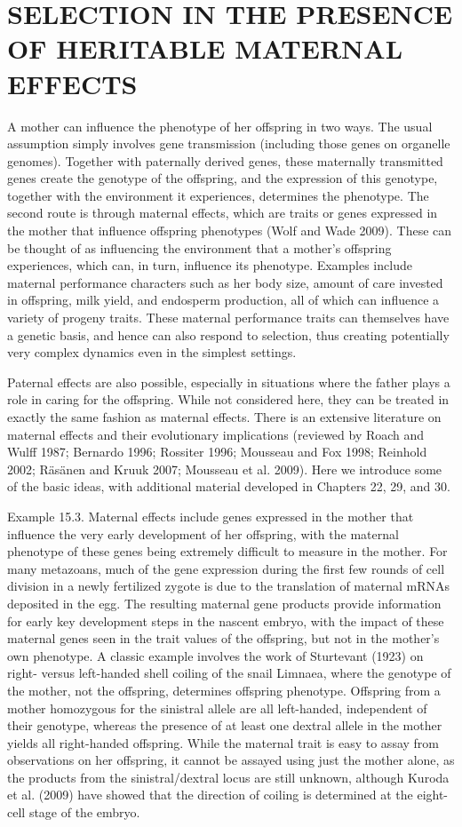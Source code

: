 \documentclass{article}
\begin{document}
\section{SELECTION IN THE PRESENCE OF HERITABLE MATERNAL EFFECTS}
A mother can influence the phenotype of her offspring in two ways. The usual assumption simply involves gene transmission (including those genes on organelle genomes). Together with paternally derived genes, these maternally transmitted genes create the genotype of the offspring, and the expression of this genotype, together with the environment it experiences, determines the phenotype. The second route is through maternal effects, which are traits or genes expressed in the mother that influence offspring phenotypes (Wolf and Wade 2009). These can be thought of as influencing the environment that a mother's offspring experiences, which can, in turn, influence its phenotype. Examples include maternal performance characters such as her body size, amount of care invested in offspring, milk yield, and endosperm production, all of which can influence a variety of progeny traits. These maternal performance traits can themselves have a genetic basis, and hence can also respond to selection, thus creating potentially very complex dynamics even in the simplest settings.

Paternal effects are also possible, especially in situations where the father plays a role in caring for the offspring. While not considered here, they can be treated in exactly the same fashion as maternal effects. There is an extensive literature on maternal effects and their evolutionary implications (reviewed by Roach and Wulff 1987; Bernardo 1996; Rossiter 1996; Mousseau and Fox 1998; Reinhold 2002; Räsänen and Kruuk 2007; Mousseau et al. 2009). Here we introduce some of the basic ideas, with additional material developed in Chapters 22, 29, and 30.

Example 15.3. Maternal effects include genes expressed in the mother that influence the very early development of her offspring, with the maternal phenotype of these genes being extremely difficult to measure in the mother. For many metazoans, much of the gene expression during the first few rounds of cell division in a newly fertilized zygote is due to the translation of maternal mRNAs deposited in the egg. The resulting maternal gene products provide information for early key development steps in the nascent embryo, with the impact of these maternal genes seen in the trait values of the offspring, but not in the mother's own phenotype. A classic example involves the work of Sturtevant (1923) on right- versus left-handed shell coiling of the snail Limnaea, where the genotype of the mother, not the offspring, determines offspring phenotype. Offspring from a mother homozygous for the sinistral allele are all left-handed, independent of their genotype, whereas the presence of at least one dextral allele in the mother yields all right-handed offspring. While the maternal trait is easy to assay from observations on her offspring, it cannot be assayed using just the mother alone, as the products from the sinistral/dextral locus are still unknown, although Kuroda et al. (2009) have showed that the direction of coiling is determined at the eight-cell stage of the embryo.
\end{document}
